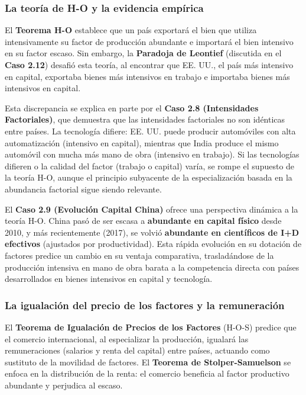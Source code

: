 \subsubsection{La teoría de H-O y la evidencia empírica}
El \textbf{Teorema H-O} establece que un país exportará el bien que utiliza intensivamente su factor de producción abundante e importará el bien intensivo en su factor escaso. Sin embargo, la \textbf{Paradoja de Leontief} (discutida en el \textbf{Caso 2.12}) desafió esta teoría, al encontrar que EE. UU., el país más intensivo en capital, exportaba bienes más intensivos en trabajo e importaba bienes más intensivos en capital.

Esta discrepancia se explica en parte por el \textbf{Caso 2.8 (Intensidades Factoriales)}, que demuestra que las intensidades factoriales no son idénticas entre países. La tecnología difiere: EE. UU. puede producir automóviles con alta automatización (intensivo en capital), mientras que India produce el mismo automóvil con mucha más mano de obra (intensivo en trabajo). Si las tecnologías difieren o la calidad del factor (trabajo o capital) varía, se rompe el supuesto de la teoría H-O, aunque el principio subyacente de la especialización basada en la abundancia factorial sigue siendo relevante.

El \textbf{Caso 2.9 (Evolución Capital China)} ofrece una perspectiva dinámica a la teoría H-O. China pasó de ser escasa a \textbf{abundante en capital físico} desde 2010, y más recientemente (2017), se volvió \textbf{abundante en científicos de I+D efectivos} (ajustados por productividad). Esta rápida evolución en su dotación de factores predice un cambio en su ventaja comparativa, trasladándose de la producción intensiva en mano de obra barata a la competencia directa con países desarrollados en bienes intensivos en capital y tecnología.

\subsubsection{La igualación del precio de los factores y la remuneración}
El \textbf{Teorema de Igualación de Precios de los Factores} (H-O-S) predice que el comercio internacional, al especializar la producción, igualará las remuneraciones (salarios y renta del capital) entre países, actuando como sustituto de la movilidad de factores. El \textbf{Teorema de Stolper-Samuelson} se enfoca en la distribución de la renta: el comercio beneficia al factor productivo abundante y perjudica al escaso.

